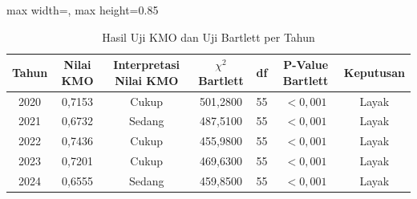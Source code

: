 \begin{table}[H]
\centering
\caption{Hasil Uji KMO dan Uji Bartlett per Tahun} \label{tab:app1kmo_bartlett}
\begin{adjustbox}{max width=\textwidth, max height=0.85\textheight}
\begin{tabular}{|c|c|c|c|c|c|c|}
\hline
\textbf{Tahun} & \textbf{Nilai KMO} & \textbf{Interpretasi Nilai KMO} & \textbf{$\chi^2$ Bartlett} & \textbf{df} & \textbf{P-Value Bartlett} & \textbf{Keputusan} \\
\hline
2020 & 0,7153 & Cukup & 501,2800 & 55 & $< 0,001$ & Layak \\
2021 & 0,6732 & Sedang & 487,5100 & 55 & $< 0,001$ & Layak \\
2022 & 0,7436 & Cukup & 455,9800 & 55 & $< 0,001$ & Layak \\
2023 & 0,7201 & Cukup & 469,6300 & 55 & $< 0,001$ & Layak \\
2024 & 0,6555 & Sedang & 459,8500 & 55 & $< 0,001$ & Layak \\
\hline
\end{tabular}
\end{adjustbox}
\end{table}